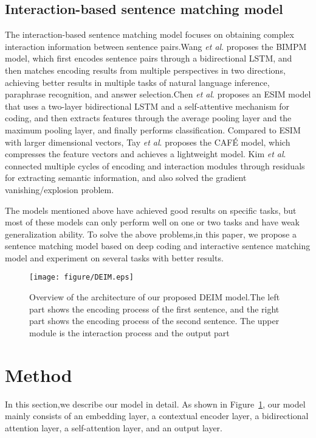 \documentclass[review]{elsarticle}
\begin{document}
\subsection{Interaction-based sentence matching model}

The interaction-based sentence matching model focuses on obtaining complex interaction information between sentence pairs.Wang {\it et al}.\cite{wang2017bilateral} proposes the BIMPM model, which first encodes sentence pairs through a bidirectional LSTM, and then matches encoding results from multiple perspectives in two directions, achieving better results in multiple tasks of natural language inference, paraphrase recognition, and answer selection.Chen {\it et al}.\cite{chen2017enhanced} proposes an ESIM model that uses a two-layer bidirectional LSTM and a self-attentive mechanism for coding, and then extracts features through the average pooling layer and the maximum pooling layer, and finally performs classification. Compared to ESIM with larger dimensional vectors, Tay {\it et al}.\cite{tay2018compare} proposes the CAFÉ model, which compresses the feature vectors and achieves a lightweight model. Kim {\it et al}.\cite{kim2019semantic} connected multiple cycles of encoding and interaction modules through residuals for extracting  semantic information, and also solved the gradient vanishing/explosion problem.

The models mentioned above have achieved good results on specific tasks, but most of these models can only perform well on one or two tasks and have weak generalization ability. To solve the above problems,in this paper, we propose a sentence matching model based on deep coding and interactive sentence matching model and experiment on several tasks with better results.
\begin{figure}[h]
\centering
\texttt{[image: figure/DEIM.eps]}
\caption{Overview of the architecture of our proposed DEIM model.The left part shows the encoding process of the first sentence, and the right part shows the encoding process of the second sentence. The upper module is the interaction process and the output part}
\label{fig:1}
\end{figure}
\section{Method}
In this section,we describe our model in detail. As shown in Figure~\ref{fig:1}, our model  mainly consists of an embedding layer, a contextual encoder layer, a bidirectional attention layer, a self-attention layer, and an output layer.
\end{document}
